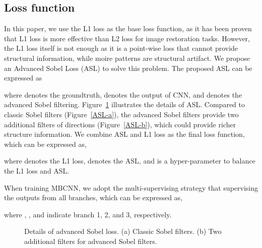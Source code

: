 \documentclass[10pt,twocolumn,letterpaper]{article}
\begin{document}
\subsection{Loss function}

In this paper, we use the L1 loss as the base loss function, as it has been proven \cite{lim2017enhanced,RDN,zhao2016loss} that L1 loss is more effective than L2 loss for image restoration tasks.
However, the L1 loss itself is not enough as it is a point-wise loss that cannot provide structural information, while moire patterns are structural artifact. 
We propose an Advanced Sobel Loss (ASL) to solve this problem. 
The proposed ASL can be expressed as

where  denotes the groundtruth,  denotes the output of CNN, and  denotes the advanced Sobel filtering. Figure~\ref{ASL} illustrates the details of ASL.
Compared to classic Sobel filters (Figure~\ref{ASL-a}), the advanced Sobel filters provide two additional  filters of  directions (Figure~\ref{ASL-b}), which could provide richer structure information. 
We combine ASL and L1 loss as the final loss function, which can be expressed as,

where  denotes the L1 loss,  denotes the ASL, and  is a hyper-parameter to balance the L1 loss and ASL.
 
When training MBCNN, we adopt the multi-supervising strategy that supervising the outputs from all branches, which can be expressed as, 

where , , and  indicate branch 1, 2, and 3, respectively. 
\begin{figure}
	\centering
	\caption{Details of advanced Sobel loss. (a) Classic Sobel filters. (b) Two additional filters for advanced Sobel filters.}
	\label{ASL}
\end{figure}
\end{document}
